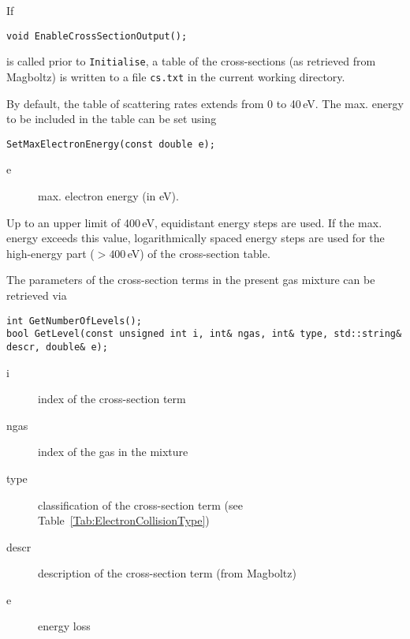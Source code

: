 If 
\begin{lstlisting}
void EnableCrossSectionOutput();
\end{lstlisting}
is called prior to \texttt{Initialise}, a table of the cross-sections 
(as retrieved from Magboltz) is written to a file \texttt{cs.txt} 
in the current working directory. 

By default, the table of scattering rates extends from 0 to 40\,eV. 
The max. energy to be included in the table can be set using
\begin{lstlisting}
SetMaxElectronEnergy(const double e);
\end{lstlisting}
\begin{description}
\item[e]
  max. electron energy (in eV).
\end{description}
Up to an upper limit of 400\,eV, equidistant energy steps are used.
If the max. energy exceeds this value, logarithmically spaced 
energy steps are used for the high-energy part ($>400$\,eV) 
of the cross-section table.

The parameters of the cross-section terms in the present gas mixture 
can be retrieved via
\begin{lstlisting}
int GetNumberOfLevels();
bool GetLevel(const unsigned int i, int& ngas, int& type, std::string& descr, double& e);
\end{lstlisting}
\begin{description}
  \item[i] index of the cross-section term
  \item[ngas] index of the gas in the mixture
  \item[type] classification of the cross-section term 
              (see Table~\ref{Tab:ElectronCollisionType})
  \item[descr] description of the cross-section term (from Magboltz)
  \item[e] energy loss
\end{description}


